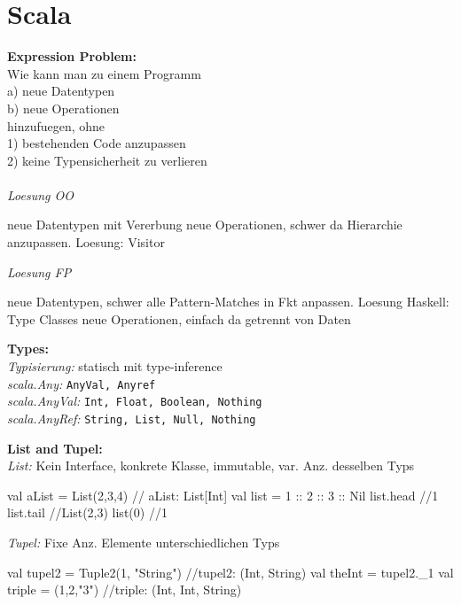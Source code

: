 
\section{Scala}

\begin{breakbox}
\textbf{Expression Problem:}\\
Wie kann man zu einem Programm \\
a) neue Datentypen \\
b) neue Operationen \\
hinzufuegen, ohne\\
1) bestehenden Code anzupassen\\
2) keine Typensicherheit zu verlieren \\\\
\emph{Loesung OO}
\begin{itemize}
	\setlength{\itemsep}{0pt}
    \setlength{\parskip}{0pt}
    \setlength{\parsep}{0pt}
    \setlength{\itemindent}{-0.15in}
	\pro neue Datentypen mit Vererbung
	\con neue Operationen, schwer da Hierarchie anzupassen. Loesung: Visitor
\end{itemize}
\emph{Loesung FP}
\begin{itemize}
	\setlength{\itemsep}{0pt}
    \setlength{\parskip}{0pt}
    \setlength{\parsep}{0pt}
    \setlength{\itemindent}{-0.15in}
	\con neue Datentypen, schwer alle Pattern-Matches in Fkt anpassen. Loesung Haskell: Type Classes
	\pro neue Operationen, einfach da getrennt von Daten
\end{itemize}
\end{breakbox}

\begin{breakbox}
\textbf{Types:}\\
\emph{Typisierung:} statisch mit type-inference\\
\emph{scala.Any:} \texttt{AnyVal, Anyref}\\
\emph{scala.AnyVal:} \texttt{Int, Float, Boolean, Nothing}\\
\emph{scala.AnyRef:} \texttt{String, List, Null, Nothing}\\
\end{breakbox}

\begin{breakbox}
\textbf{List and Tupel:}\\
\emph{List:} Kein Interface, konkrete Klasse, immutable, var. Anz. desselben Typs\\
\begin{scalacode}
val aList = List(2,3,4) // aList: List[Int]
val list = 1 :: 2 :: 3 :: Nil
list.head //1
list.tail //List(2,3)
list(0) //1
\end{scalacode}

\emph{Tupel:} Fixe Anz. Elemente unterschiedlichen Typs\\
\begin{scalacode}
val tupel2 = Tuple2(1, "String") //tupel2: (Int, String)
val theInt = tupel2._1
val triple = (1,2,"3") //triple: (Int, Int, String)
\end{scalacode}
\end{breakbox}

